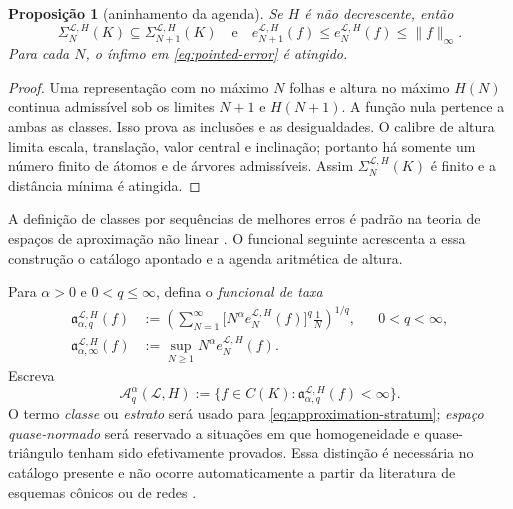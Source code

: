 \documentclass[11pt,a4paper]{article}
\newtheorem{proposition}[theorem]{Proposição}
\theoremstyle{definition}
\theoremstyle{remark}
\newcommand{\Library}{\mathcal{L}}
\begin{document}
\begin{proposition}[aninhamento da agenda]
\label{prop:schedule-nesting}
Se $H$ é não decrescente, então
\begin{equation}
 \Sigma_N^{\Library,H}(K)
 \subseteq\Sigma_{N+1}^{\Library,H}(K)
 \quad\text{e}\quad
 e_{N+1}^{\Library,H}(f)\le e_N^{\Library,H}(f)\le\|f\|_\infty.
 \label{eq:schedule-nesting}
\end{equation}
Para cada $N$, o ínfimo em \eqref{eq:pointed-error} é atingido.
\end{proposition}

\begin{proof}
Uma representação com no máximo $N$ folhas e altura no máximo $H(N)$
continua admissível sob os limites $N+1$ e $H(N+1)$. A função nula pertence
a ambas as classes. Isso prova as inclusões e as desigualdades. O calibre de
altura limita escala, translação, valor central e inclinação; portanto há
somente um número finito de átomos e de árvores admissíveis. Assim
$\Sigma_N^{\Library,H}(K)$ é finito e a distância mínima é atingida.
\end{proof}

A definição de classes por sequências de melhores erros é padrão na teoria de
espaços de aproximação não linear \citep{devore1998}. O funcional seguinte
acrescenta a essa construção o catálogo apontado e a agenda aritmética de
altura.

Para $\alpha>0$ e $0<q\le\infty$, defina o \emph{funcional de taxa}
\begin{align}
 \mathfrak a_{\alpha,q}^{\Library,H}(f)
 &:=\left(\sum_{N=1}^{\infty}
       \bigl[N^\alpha e_N^{\Library,H}(f)\bigr]^q\frac1N
       \right)^{1/q}, &&0<q<\infty,
 \label{eq:rate-functional-finite}\\
 \mathfrak a_{\alpha,\infty}^{\Library,H}(f)
 &:=\sup_{N\ge1}N^\alpha e_N^{\Library,H}(f).
 \label{eq:rate-functional-infty}
\end{align}
Escreva
\begin{equation}
 \mathscr A_{q}^{\alpha}(\Library,H)
 :=\{f\in C(K):\mathfrak a_{\alpha,q}^{\Library,H}(f)<\infty\}.
 \label{eq:approximation-stratum}
\end{equation}
O termo \emph{classe} ou \emph{estrato} será usado para
\eqref{eq:approximation-stratum}; \emph{espaço quase-normado} será reservado
a situações em que homogeneidade e quase-triângulo tenham sido efetivamente
provados. Essa distinção é necessária no catálogo presente e não ocorre
automaticamente a partir da literatura de esquemas cônicos ou de redes
\citep{gribonval2022,grohs2023}.
\end{document}
